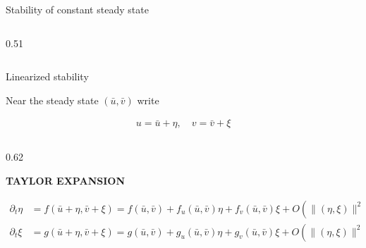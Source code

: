 \begin{frame}{Stability of constant steady state}
\begin{columns}[c,onlytextwidth]
\begin{column}{0.51\textwidth}

  \end{column}

\end{columns}

\end{frame}


\begin{frame}{Linearized stability}

  \vspace{-0.22cm}

  {\color{HydraMuted}\fontsize{7.9}{9.6}\selectfont
    Near the steady state $(\bar u,\bar v)$ write
  \par}

  \vspace{-0.40cm}

  {\color{HydraWhite}\fontsize{10.2}{13}\selectfont
  \begin{align*}
    u=\bar u+\eta, \quad 
    v=\bar v+\xi
  \end{align*}
  }

  \vspace{-0.52cm}

  \begin{columns}[T,onlytextwidth]

    \begin{column}{0.62\textwidth}
      {\color{HydraGold}\bfseries\fontsize{7.7}{9.2}\selectfont
        TAYLOR EXPANSION\par}

      \vspace{-0.24cm}

      {\color{HydraWhite}\fontsize{8.6}{10.8}\selectfont
      \begin{align*}
        \partial_t \eta
        &=
        f(\bar u+\eta,\bar v+\xi)=f(\bar u,\bar v)
        +
        f_u(\bar u,\bar v)\eta
        +
        f_v(\bar u,\bar v)\xi
        +
        O\!\left(\lVert(\eta,\xi)\rVert^2\right) \\
        \partial_t \xi
        &=
        g(\bar u+\eta,\bar v+\xi)=g(\bar u,\bar v)
        +
        g_u(\bar u,\bar v)\eta
        +
        g_v(\bar u,\bar v)\xi
        +
        O\!\left(\lVert(\eta,\xi)\rVert^2\right)
      \end{align*}
      }


\end{column}
\end{columns}
\end{frame}
